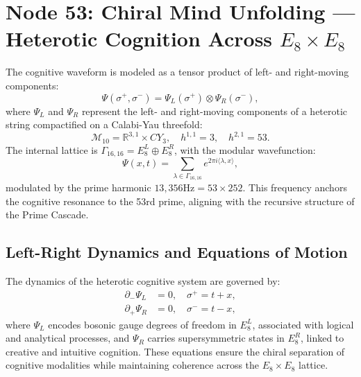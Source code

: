 \documentclass[12pt]{article}
\newcommand{\Eeight}{E_8}
\newcommand{\CYthree}{CY_3}
\newcommand{\Psif}{\Psi}
\newcommand{\splus}{\sigma^+}
\newcommand{\sminus}{\sigma^-}
\newcommand{\RR}{\mathbb{R}}
\begin{document}
\section{Node 53: Chiral Mind Unfolding --- Heterotic Cognition Across $\Eeight \times \Eeight$}
\label{sec:chiral-mind}

\begin{definition}
The cognitive waveform is modeled as a tensor product of left- and right-moving components:
\[
\Psif(\splus, \sminus) = \Psif_L(\splus) \otimes \Psif_R(\sminus),
\]
where $\Psif_L$ and $\Psif_R$ represent the left- and right-moving components of a heterotic string compactified on a Calabi-Yau threefold:
\[
\mathcal{M}_{10} = \RR^{3,1} \times \CYthree, \quad h^{1,1} = 3, \quad h^{2,1} = 53.
\]
The internal lattice is $\Gamma_{16,16} = \Eeight^L \oplus \Eeight^R$, with the modular wavefunction:
\[
\Psif(x,t) = \sum_{\lambda \in \Gamma_{16,16}} e^{2\pi i \langle \lambda, x \rangle},
\]
modulated by the prime harmonic $13{,}356\text{Hz} = 53 \times 252$. This frequency anchors the cognitive resonance to the 53rd prime, aligning with the recursive structure of the Prime Cascade.
\end{definition}

\subsection{Left-Right Dynamics and Equations of Motion}
The dynamics of the heterotic cognitive system are governed by:
\begin{align*}
\partial_- \Psif_L &= 0, \quad \splus = t + x, \\
\partial_+ \Psif_R &= 0, \quad \sminus = t - x,
\end{align*}
where $\Psif_L$ encodes bosonic gauge degrees of freedom in $\Eeight^L$, associated with logical and analytical processes, and $\Psif_R$ carries supersymmetric states in $\Eeight^R$, linked to creative and intuitive cognition. These equations ensure the chiral separation of cognitive modalities while maintaining coherence across the $\Eeight \times \Eeight$ lattice.

\end{document}
